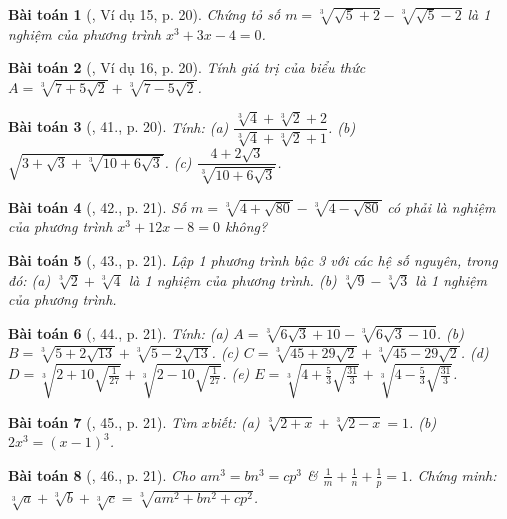 \documentclass{article}
\newtheorem{baitoan}{Bài toán}
\begin{document}
\begin{baitoan}[\cite{Binh_Toan_9_tap_1}, Ví dụ 15, p. 20]
	Chứng tỏ số $m = \sqrt[3]{\sqrt{5} + 2} - \sqrt[3]{\sqrt{5} - 2}$ là 1 nghiệm của phương trình $x^3 + 3x - 4 = 0$.
\end{baitoan}

\begin{baitoan}[\cite{Binh_Toan_9_tap_1}, Ví dụ 16, p. 20]
	Tính giá trị của biểu thức $A = \sqrt[3]{7 + 5\sqrt{2}} + \sqrt[3]{7 - 5\sqrt{2}}$.
\end{baitoan}

\begin{baitoan}[\cite{Binh_Toan_9_tap_1}, 41., p. 20]
	Tính: (a) $\dfrac{\sqrt[3]{4} + \sqrt[3]{2} + 2}{\sqrt[3]{4} + \sqrt[3]{2} + 1}$. (b) $\sqrt{3 + \sqrt{3} + \sqrt[3]{10 + 6\sqrt{3}}}$. (c) $\dfrac{4 + 2\sqrt{3}}{\sqrt[3]{10 + 6\sqrt{3}}}$.
\end{baitoan}

\begin{baitoan}[\cite{Binh_Toan_9_tap_1}, 42., p. 21]
	Số $m = \sqrt[3]{4 + \sqrt{80}} - \sqrt[3]{4 - \sqrt{80}}$ có phải là nghiệm của phương trình $x^3 + 12x - 8 = 0$ không?
\end{baitoan}

\begin{baitoan}[\cite{Binh_Toan_9_tap_1}, 43., p. 21]
	Lập 1 phương trình bậc 3 với các hệ số nguyên, trong đó: (a) $\sqrt[3]{2} + \sqrt[3]{4}$ là 1 nghiệm của phương trình. (b) $\sqrt[3]{9} - \sqrt[3]{3}$ là 1 nghiệm của phương trình.
\end{baitoan}

\begin{baitoan}[\cite{Binh_Toan_9_tap_1}, 44., p. 21]
	Tính: (a) $A = \sqrt[3]{6\sqrt{3} + 10} - \sqrt[3]{6\sqrt{3} - 10}$. (b) $B = \sqrt[3]{5 + 2\sqrt{13}} + \sqrt[3]{5 - 2\sqrt{13}}$. (c) $C = \sqrt[3]{45 + 29\sqrt{2}} + \sqrt[3]{45 - 29\sqrt{2}}$. (d) $D = \sqrt[3]{2 + 10\sqrt{\frac{1}{27}}} + \sqrt[3]{2 - 10\sqrt{\frac{1}{27}}}$. (e) $E = \sqrt[3]{4 + \frac{5}{3}\sqrt{\frac{31}{3}}} + \sqrt[3]{4 - \frac{5}{3}\sqrt{\frac{31}{3}}}$.
\end{baitoan}

\begin{baitoan}[\cite{Binh_Toan_9_tap_1}, 45., p. 21]
	Tìm $x$biết: (a) $\sqrt[3]{2 + x} + \sqrt[3]{2 - x} = 1$. (b) $2x^3 = (x - 1)^3$.
\end{baitoan}

\begin{baitoan}[\cite{Binh_Toan_9_tap_1}, 46., p. 21]
	Cho $am^3 = bn^3 = cp^3$ \& $\frac{1}{m} + \frac{1}{n} + \frac{1}{p} = 1$. Chứng minh: $\sqrt[3]{a} + \sqrt[3]{b} + \sqrt[3]{c} = \sqrt[3]{am^2 + bn^2 + cp^2}$.
\end{baitoan}
\end{document}
